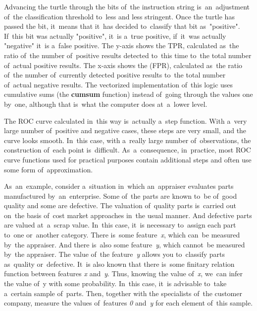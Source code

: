 \documentclass[]{scrreprt}
\begin{document}
Advancing the turtle through the bits of~the instruction string is~an~adjustment of~the classification threshold to~less and less stringent. Once the turtle has passed the bit, it~means that it~has decided to~classify that bit as~"positive". If~this bit was actually "positive", it~is a~true positive, if~it~was actually "negative" it~is a~false positive. The y-axis shows the TPR, calculated as~the ratio of~the number of~positive results detected to~this time to~the total number of~actual positive results. The x-axis shows the (FPR), calculated as~the ratio of~the number of~currently detected positive results to~the total number of~actual negative results. The vectorized implementation of~this logic uses cumulative sums (the \textbf{cumsum} function) instead of~going through the values one by~one, although that is~what the computer does at~a~lower level.

The ROC curve calculated in~this way is~actually a~step function. With a~very large number of~positive and negative cases, these steps are very small, and the curve looks smooth. In~this case, with a~really large number of~observations, the construction of~each point is~difficult. As~a~consequence, in~practice, most ROC curve functions used for practical purposes contain additional steps and often use some form of~approximation.

As~an~example, consider a~situation in~which an~appraiser evaluates parts manufactured by~an~enterprise. Some of~the parts are known to~be of~good quality and some are defective. The valuation of~quality parts is~carried out on~the basis of~cost market approaches in~the usual manner. And defective parts are valued at~a~scrap value. In~this case, it~is necessary to~assign each part to~one or~another category. There is~some feature~\emph{x}, which can~be measured by~the appraiser. And there is~also some feature~\emph{y}, which cannot~be measured by~the appraiser. The value of~the feature~\emph{y} allows you to~classify parts as~quality or~defective. It~is also known that there is~some finitary relation function between features \emph{x} and~\emph{y}. Thus, knowing the value of~\emph{x}, we~can infer the value of~y with some probability.
In~this case, it~is advisable to~take a~certain sample of~parts. Then, together with the specialists of~the customer company, measure the values of~features \emph{0} and~\emph{y} for each element of~this sample.
\end{document}
